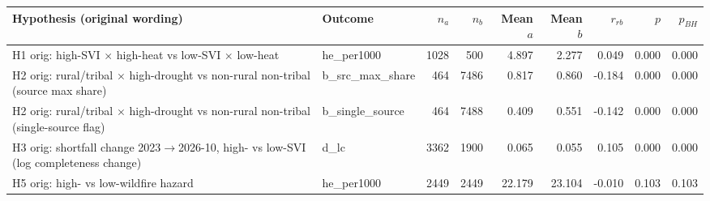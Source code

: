 {\footnotesize
\begin{tabular}{p{4.3cm}lrrrrrrr}
\toprule
Hypothesis (original wording) & Outcome & $n_a$ & $n_b$ & Mean $a$ & Mean $b$ & $r_{rb}$ & $p$ & $p_{BH}$ \\
\midrule
H1 orig: high-SVI $\times$ high-heat vs low-SVI $\times$ low-heat & he\_per1000 & 1028 & 500 & 4.897 & 2.277 & 0.049 & 0.000 & 0.000 \\
H2 orig: rural/tribal $\times$ high-drought vs non-rural non-tribal (source max share) & b\_src\_max\_share & 464 & 7486 & 0.817 & 0.860 & -0.184 & 0.000 & 0.000 \\
H2 orig: rural/tribal $\times$ high-drought vs non-rural non-tribal (single-source flag) & b\_single\_source & 464 & 7488 & 0.409 & 0.551 & -0.142 & 0.000 & 0.000 \\
H3 orig: shortfall change 2023$\to$2026-10, high- vs low-SVI (log completeness change) & d\_lc & 3362 & 1900 & 0.065 & 0.055 & 0.105 & 0.000 & 0.000 \\
H5 orig: high- vs low-wildfire hazard & he\_per1000 & 2449 & 2449 & 22.179 & 23.104 & -0.010 & 0.103 & 0.103 \\
\bottomrule
\end{tabular}
}